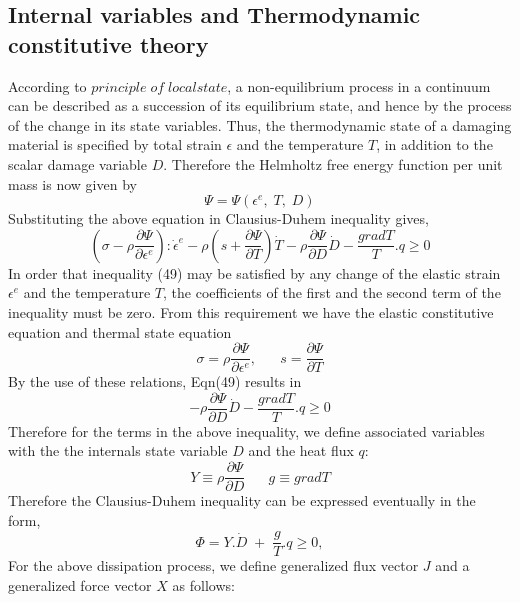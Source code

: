 \documentclass[a4paper,12pt]{article}
\begin{document}
\subsection{Internal variables and Thermodynamic constitutive theory}
\indent\indent\indent  According to $principle\; of \;local state$, a non-equilibrium process in a continuum can be described as a succession of its equilibrium state, and hence by the process of the change in its state variables. Thus, the thermodynamic state of a damaging material is specified by total strain $\epsilon$ and the temperature $T$, in addition to the scalar damage variable $D$. Therefore the Helmholtz free energy function per unit mass is now given by
\begin{equation}
\Psi  = \Psi(\epsilon^{e},\; T,\; D)
\end{equation}
Substituting the above equation in Clausius-Duhem inequality gives,
\begin{equation}
(\sigma  -  \rho\frac{\partial\Psi}{\partial\epsilon^{e}}):\dot{\epsilon}^{e} - \rho(s +\frac{\partial\Psi}{\partial T})\dot{T}  - \rho\frac{\partial\Psi}{\partial D}\dot{D}  - \frac{gradT}{T}.q  \geq 0 
\end{equation}
In order that inequality (49) may be satisfied by any change of the elastic strain $\epsilon^{e}$ and the temperature $T$, the coefficients of the first and the second term of the inequality must be zero. From this requirement we have the elastic constitutive equation and thermal state equation
\begin{equation}
\sigma  = \rho\frac{\partial\Psi}{\partial\epsilon^{e}}, \;\;\;\;\;\;  s = \frac{\partial\Psi}{\partial T} 
\end{equation}
By the use of these relations, Eqn(49) results in
\begin{equation}
- \rho\frac{\partial\Psi}{\partial D}\dot{D}  - \frac{gradT}{T}.q  \geq 0 
\end{equation}
Therefore for the terms in the above inequality, we define associated variables with the the internals state variable $D$ and the heat flux $q$:
\begin{equation}
Y \equiv \rho\frac{\partial\Psi}{\partial D}  \;\;\;\;\;\; g \equiv gradT 
\end{equation}
Therefore the Clausius-Duhem inequality can be expressed eventually in the form,
\begin{equation}
\Phi  =  Y.\dot{D}  \;  + \; \frac{g}{T} .q  \geq 0,
\end{equation}
For the above dissipation process, we define generalized flux vector $J$ and a generalized force vector $X$ as follows:
\end{document}
